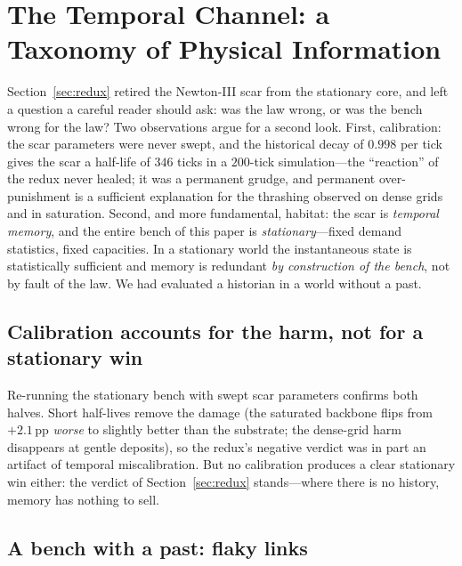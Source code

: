﻿%
\section{The Temporal Channel: a Taxonomy of Physical Information}
\label{sec:taxonomy}

Section~\ref{sec:redux} retired the Newton-III scar from the stationary core,
and left a question a careful reader should ask: was the law wrong, or was the
bench wrong for the law? Two observations argue for a second look. First,
calibration: the scar parameters were never swept, and the historical decay of
$0.998$ per tick gives the scar a half-life of $346$ ticks in a $200$-tick
simulation---the ``reaction'' of the redux never healed; it was a permanent
grudge, and permanent over-punishment is a sufficient explanation for the
thrashing observed on dense grids and in saturation. Second, and more
fundamental, habitat: the scar is \emph{temporal memory}, and the entire bench
of this paper is \emph{stationary}---fixed demand statistics, fixed
capacities. In a stationary world the instantaneous state is statistically
sufficient and memory is redundant \emph{by construction of the bench}, not by
fault of the law. We had evaluated a historian in a world without a past.

\subsection{Calibration accounts for the harm, not for a stationary win}

Re-running the stationary bench with swept scar parameters confirms both
halves. Short half-lives remove the damage (the saturated backbone flips from
$+2.1$\,pp \emph{worse} to slightly better than the substrate; the dense-grid
harm disappears at gentle deposits), so the redux's negative verdict was in
part an artifact of temporal miscalibration. But no calibration produces a
clear stationary win either: the verdict of Section~\ref{sec:redux}
stands---where there is no history, memory has nothing to sell.

\subsection{A bench with a past: flaky links}

